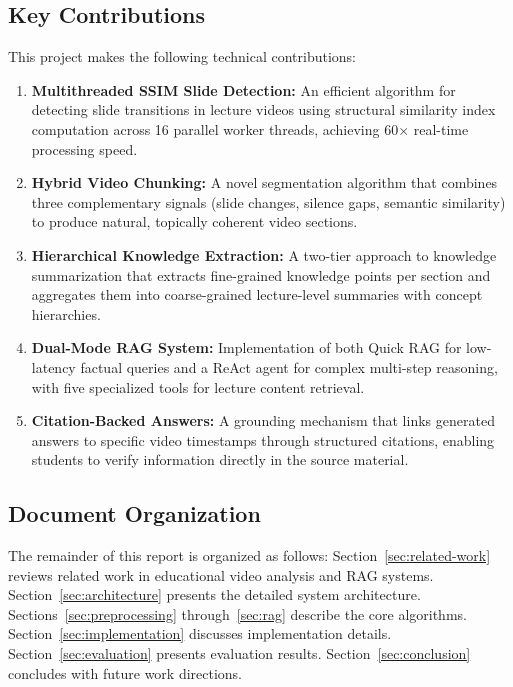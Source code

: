 \documentclass[12pt,a4paper]{article}
\begin{document}
\subsection{Key Contributions}

This project makes the following technical contributions:

\begin{enumerate}
    \item \textbf{Multithreaded SSIM Slide Detection:} An efficient algorithm for detecting slide transitions in lecture videos using structural similarity index computation across 16 parallel worker threads, achieving 60$\times$ real-time processing speed.
    
    \item \textbf{Hybrid Video Chunking:} A novel segmentation algorithm that combines three complementary signals (slide changes, silence gaps, semantic similarity) to produce natural, topically coherent video sections.
    
    \item \textbf{Hierarchical Knowledge Extraction:} A two-tier approach to knowledge summarization that extracts fine-grained knowledge points per section and aggregates them into coarse-grained lecture-level summaries with concept hierarchies.
    
    \item \textbf{Dual-Mode RAG System:} Implementation of both Quick RAG for low-latency factual queries and a ReAct agent for complex multi-step reasoning, with five specialized tools for lecture content retrieval.
    
    \item \textbf{Citation-Backed Answers:} A grounding mechanism that links generated answers to specific video timestamps through structured citations, enabling students to verify information directly in the source material.
\end{enumerate}

\subsection{Document Organization}

The remainder of this report is organized as follows: Section~\ref{sec:related-work} reviews related work in educational video analysis and RAG systems. Section~\ref{sec:architecture} presents the detailed system architecture. Sections~\ref{sec:preprocessing} through~\ref{sec:rag} describe the core algorithms. Section~\ref{sec:implementation} discusses implementation details. Section~\ref{sec:evaluation} presents evaluation results. Section~\ref{sec:conclusion} concludes with future work directions.
\end{document}
